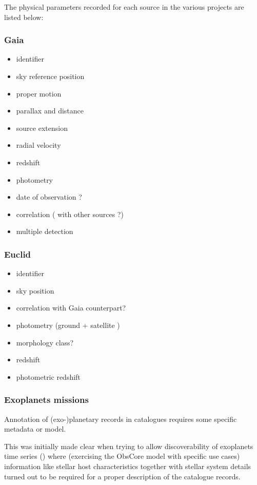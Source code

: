 \documentclass[11pt,a4paper]{ivoa}
\begin{document}
The physical parameters recorded for each source in the various projects are listed below:
\subsubsection{Gaia}
\begin{itemize}
    \item identifier
    \item sky reference position
    \item proper motion
    \item parallax and distance

    \item source extension
    \item radial velocity
    \item redshift
    \item photometry
    \item date of observation ?
    \item correlation ( with other sources ?)
    \item multiple detection
\end{itemize}


\subsubsection{Euclid}
\begin{itemize}
    \item identifier
    \item sky position
    \item correlation with Gaia counterpart?
    \item photometry (ground + satellite )
    \item morphology class?
    \item redshift
    \item photometric redshift
\end{itemize}

\subsubsection{Exoplanets missions}
Annotation of (exo-)planetary records in catalogues requires some
specific metadata or model. 

This was initially made clear when trying to
allow discoverability of exoplanets time series
(\cite{2020ASPC..522..703M}) where (exercising the
ObsCore model with specific use cases) information like stellar host
characteristics together with stellar system details turned out to be required for a
proper description of the catalogue records. 
\end{document}
